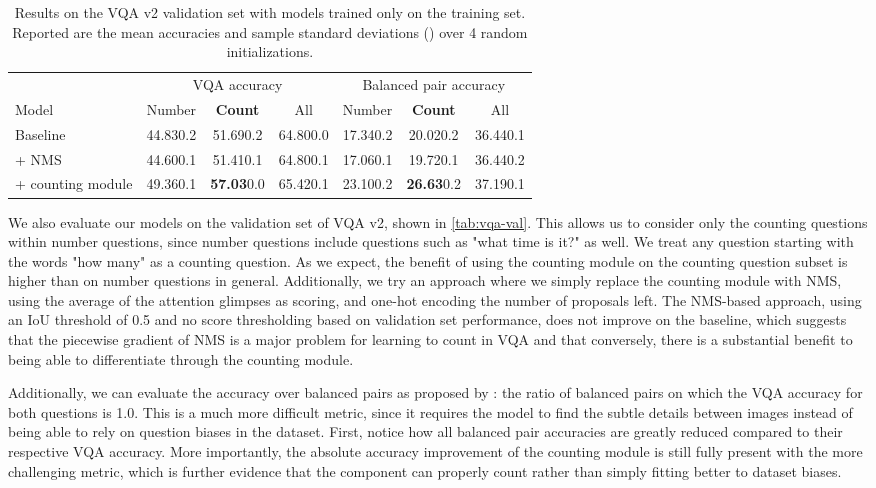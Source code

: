\documentclass[letterpaper]{article}
\begin{document}
\setlength\tabcolsep{4.2pt}
\begin{table}
    \caption{
        Results on the VQA v2 validation set with models trained only on the training set.
        Reported are the mean accuracies and sample standard deviations () over 4 random initializations.
    }
    \label{tab:vqa-val}
    \centering
    \begin{tabular}{l c c c c c c}
        \\
        \toprule
        & \multicolumn{3}{c}{VQA accuracy} & \multicolumn{3}{c}{Balanced pair accuracy} \\
        \cmidrule(l{4pt}){2-4} \cmidrule(l{4pt}){5-7}
        Model & Number & \textbf{Count} & All & Number & \textbf{Count} & All \\
        \hline
        Baseline & 44.830.2 & 51.690.2 & 64.800.0 & 17.340.2 & 20.020.2 & 36.440.1 \\
        + NMS & 44.600.1 & 51.410.1 & 64.800.1 & 17.060.1 & 19.720.1 & 36.440.2 \\
        + counting module & 49.360.1 & \textbf{57.03}0.0 & 65.420.1 & 23.100.2 & \textbf{26.63}0.2 & 37.190.1 \\
        \bottomrule
    \end{tabular}
\end{table}


We also evaluate our models on the validation set of VQA v2, shown in \autoref{tab:vqa-val}.
This allows us to consider only the counting questions within number questions, since number questions include questions such as "what time is it?" as well.
We treat any question starting with the words "how many" as a counting question.
As we expect, the benefit of using the counting module on the counting question subset is higher than on number questions in general.
Additionally, we try an approach where we simply replace the counting module with NMS, using the average of the attention glimpses as scoring, and one-hot encoding the number of proposals left.
The NMS-based approach, using an IoU threshold of 0.5 and no score thresholding based on validation set performance, does not improve on the baseline, which suggests that the piecewise gradient of NMS is a major problem for learning to count in VQA and that conversely, there is a substantial benefit to being able to differentiate through the counting module.

Additionally, we can evaluate the accuracy over balanced pairs as proposed by \citet{Teney2017a}: the ratio of balanced pairs on which the VQA accuracy for both questions is 1.0.
This is a much more difficult metric, since it requires the model to find the subtle details between images instead of being able to rely on question biases in the dataset.
First, notice how all balanced pair accuracies are greatly reduced compared to their respective VQA accuracy.
More importantly, the absolute accuracy improvement of the counting module is still fully present with the more challenging metric, which is further evidence that the component can properly count rather than simply fitting better to dataset biases.
\end{document}
